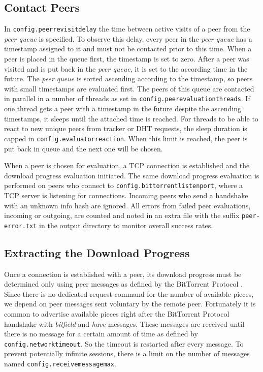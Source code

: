 \documentclass[10pt, a4paper, twoside, headsepline]{scrbook}
\renewcommand{\_}{\origunderscore\allowbreak}
\newcommand{\config}[1]{\texttt{config.\allowbreak #1}}
\begin{document}
\subsection{Contact Peers}
In \config{peer\_revisit\_delay} the time between active visits of a peer from the \emph{peer queue} is specified. To observe this delay, every peer in the \emph{peer queue} has a timestamp assigned to it and must not be contacted prior to this time. When a peer is placed in the queue first, the timestamp is set to zero. After a peer was visited and is put back in the \emph{peer queue}, it is set to the according time in the future. The \emph{peer queue} is sorted ascending according to the timestamp, so peers with small timestamps are evaluated first. The peers of this queue are contacted in parallel in a number of threads as set in \config{peer\_evaluation\_threads}. If one thread gets a peer with a timestamp in the future despite the ascending timestamps, it sleeps until the attached time is reached. For threads to be able to react to new unique peers from tracker or DHT requests, the sleep duration is capped in \config{evaluator\_reaction}. When this limit is reached, the peer is put back in queue and the next one will be chosen.

When a peer is chosen for evaluation, a TCP connection is established and the download progress evaluation initiated. The same download progress evaluation is performed on peers who connect to \config{bittorrent\_listen\_port}, where a TCP server is listening for connections. Incoming peers who send a handshake with an unknown info hash are ignored. All errors from failed peer evaluations, incoming or outgoing, are counted and noted in an extra file with the suffix \texttt{\_peer-error.txt} in the output directory to monitor overall success rates.

\subsection{Extracting the Download Progress}
\label{peer-evaluation}
Once a connection is established with a peer, its download progress must be determined only using peer messages as defined by the BitTorrent Protocol \cite{bep3}. Since there is no dedicated request command for the number of available pieces, we depend on peer messages sent voluntary by the remote peer. Fortunately it is common to advertise available pieces right after the BitTorrent Protocol handshake with \emph{bitfield} and \emph{have} messages. These messages are received until there is no message for a certain amount of time as defined by \config{network\_timeout}. So the timeout is restarted after every message. To prevent potentially infinite sessions, there is a limit on the number of messages named \config{receive\_message\_max}.
\end{document}
